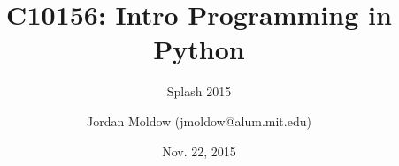 \usepackage[english]{babel}

\usepackage[latin1]{inputenc}

\usepackage{times}
\usepackage[T1]{fontenc}
\usepackage{amsmath,amssymb,amsfonts}

\usepackage{textcomp, inputenc}
\renewcommand{\ttdefault}{pcr}

\renewcommand{\subject}{C10156: Intro Programming in Python}
\title %
{\subject}


\subtitle
{%
  Splash 2015%
}

\author %
{Jordan Moldow ({\ttfamily jmoldow@alum.mit.edu})
}


\date %
{Nov. 22, 2015}













\maketitle
\begin{frame}
  \titlepage
\end{frame}

